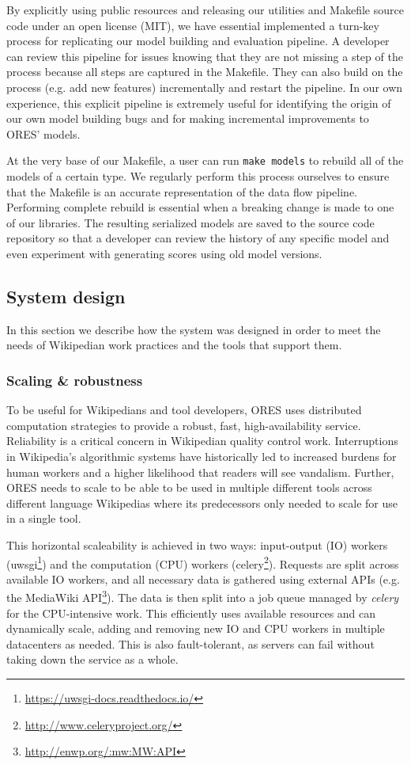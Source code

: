 By explicitly using public resources and releasing our utilities and Makefile source code under an open license (MIT), we have essential implemented a turn-key process for replicating our model building and evaluation pipeline.  A developer can review this pipeline for issues knowing that they are not missing a step of the process because all steps are captured in the Makefile.  They can also build on the process (e.g. add new features) incrementally and restart the pipeline.  In our own experience, this explicit pipeline is extremely useful for identifying the origin of our own model building bugs and for making incremental improvements to ORES' models.

At the very base of our Makefile, a user can run \texttt{make models} to rebuild all of the models of a certain type.  We regularly perform this process ourselves to ensure that the Makefile is an accurate representation of the data flow pipeline.  Performing complete rebuild is essential when a breaking change is made to one of our libraries.  The resulting serialized models are saved to the source code repository so that a developer can review the history of any specific model and even experiment with generating scores using old model versions.

\subsection{System design}
In this section we describe how the system was designed in order to meet the needs of Wikipedian work practices and the tools that support them.

\subsubsection{Scaling \& robustness}
To be useful for Wikipedians and tool developers, ORES uses distributed computation strategies to provide a robust, fast, high-availability service.  Reliability is a critical concern in Wikipedian quality control work.  Interruptions in Wikipedia's algorithmic systems have historically led to increased burdens for human workers and a higher likelihood that readers will see vandalism\cite{geiger2013levee}.  Further, ORES needs to scale to be able to be used in multiple different tools across different language Wikipedias where its predecessors only needed to scale for use in a single tool.

This horizontal scaleability is achieved in two ways: input-output (IO) workers (uwsgi\footnote{\url{https://uwsgi-docs.readthedocs.io/}}) and the computation (CPU) workers (celery\footnote{\url{http://www.celeryproject.org/}}).  Requests are split across available IO workers, and all necessary data is gathered using external APIs (e.g. the MediaWiki API\footnote{\url{http://enwp.org/:mw:MW:API}}).  The data is then split into a job queue managed by \emph{celery} for the CPU-intensive work.  This efficiently uses available resources and can dynamically scale, adding and removing new IO and CPU workers in multiple datacenters as needed.  This is also fault-tolerant, as servers can fail without taking down the service as a whole.


